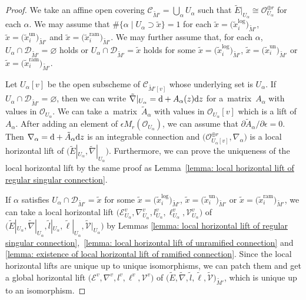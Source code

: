 \documentclass[pdftex]{sigma}
\numberwithin{equation}{section}
\begin{document}
\begin{proof}
We take an affine open covering
${\mathcal C}_{\tilde{M}'} =\bigcup _{\alpha} U_{\alpha}$
such that
$\tilde{E}|_{U_{\alpha}}
\cong {\mathcal O}_{U_{\alpha}}^{\oplus r}$ for each $\alpha$.
We may assume that
$\# \big\{ \alpha \mid U_{\alpha} \supset \tilde{x} \big\}
=1$
for each
$\tilde{x}=\big(\tilde{x}^{\mathrm{log}}_i\big)_{\tilde{M}'}$, $\tilde{x}=\big(\tilde{x}^{\mathrm{un}}_i\big)_{\tilde{M}'}$
and $\tilde{x}=\big(\tilde{x}^{\mathrm{ram}}_i\big)_{\tilde{M}'}$.
We may further assume that, for each $\alpha$,
$U_{\alpha} \cap {\mathcal D}_{\tilde{M}'}=\varnothing$ holds or
$U_{\alpha} \cap {\mathcal D}_{\tilde{M}'}=\tilde{x}$
holds for some $\tilde{x}=\big(\tilde{x}^{\mathrm{log}}_i\big)_{\tilde{M}'}$,
$\tilde{x}=\big(\tilde{x}^{\mathrm{un}}_i\big)_{\tilde{M}'}$
or $\tilde{x}=\big(\tilde{x}^{\mathrm{ram}}_i\big)_{\tilde{M}'}$.

Let $U_{\alpha}[v]$ be the open subscheme of ${\mathcal C}_{\tilde{M}'[v]}$
whose underlying set is $U_{\alpha}$.
If $U_{\alpha}\cap {\mathcal D}_{\tilde{M}'}=\varnothing$,
then we can write
$\tilde{\nabla}|_{U_{\alpha}}={\rm d}+A_{\alpha}(z){\rm d}z$
for a~matrix~$A_{\alpha}$ with values in ${\mathcal O}_{U_{\alpha}}$.
We can take a~matrix~$\tilde{A}_{\alpha}$ with values in
${\mathcal O}_{U_{\alpha}}[v]$ which is a lift of $A_{\alpha}$.
After adding an element of $\epsilon M_r({\mathcal O}_{U_{\alpha}})$,
we can assume that $\partial \tilde{A}_{\alpha}/\partial \epsilon=0$.
Then $\nabla_{\alpha}={\rm d}+\tilde{A}_{\alpha}{\rm d}z$
is an integrable connection
and $\big({\mathcal O}_{U_{\alpha}[v]}^{\oplus r},\nabla_{\alpha}\big)$
is a local horizontal lift of
$\big(\tilde{E}|_{U_{\alpha}},\tilde{\nabla}|_{U_{\alpha}}\big)$.
Furthermore, we can prove the uniqueness of the local horizontal lift
by the same proof as Lemma~\ref{lemma: local horizontal lift of regular singular connection}.

If $\alpha$ satisfies
$U_{\alpha} \cap {\mathcal D}_{\tilde{M}'}=\tilde{x}$
for some $\tilde{x}=\big(\tilde{x}^{\mathrm{log}}_i\big)_{\tilde{M}'}$,
$\tilde{x}=\big(\tilde{x}^{\mathrm{un}}_i\big)_{\tilde{M}'}$
or $\tilde{x}=\big(\tilde{x}^{\mathrm{ram}}_i\big)_{\tilde{M}'}$,
we can take a local horizontal lift
$\big({\mathcal E}^v_{U_{\alpha}},\nabla^v_{U_{\alpha}},l^v_{U_{\alpha}},\ell^v_{U_{\alpha}},
{\mathcal V}^v_{U_{\alpha}}\big)$
of
$\big(\tilde{E}|_{U_{\alpha}},\tilde{\nabla}|_{U_{\alpha}},
\tilde{l}|_{U_{\alpha}},\tilde{\ell}|_{U_{\alpha}},\tilde{\mathcal V}|_{U_{\alpha}}\big)$
by Lemmas \ref{lemma: local horizontal lift of regular singular connection},~\ref{lemma: local horizontal lift of unramified connection} and
\ref{lemma: existence of local horizontal lift of ramified connection}.
Since the local horizontal lifts are unique up to unique isomorphisms,
we can patch them and get a global horizontal lift
$\big({\mathcal E}^v,\nabla^v,l^v,\ell^v,{\mathcal V}^v \big)$
of
$\big(\tilde{E},\tilde{\nabla}, \tilde{l}, \tilde{\ell},
\tilde{\mathcal V}\big)_{\tilde{M}'}$,
which is unique up to an isomorphism.
\end{proof}
\end{document}
